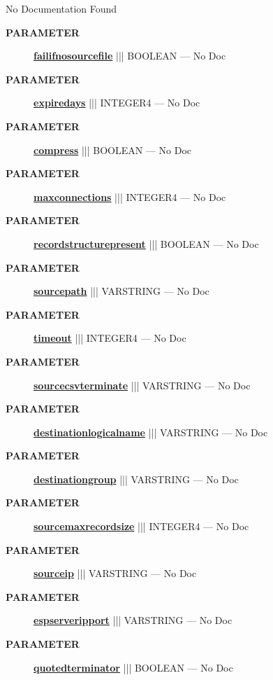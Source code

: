 No Documentation Found






\par
\begin{description}
\item [\colorbox{tagtype}{\color{white} \textbf{\textsf{PARAMETER}}}] \textbf{\underline{failifnosourcefile}} ||| BOOLEAN --- No Doc
\item [\colorbox{tagtype}{\color{white} \textbf{\textsf{PARAMETER}}}] \textbf{\underline{expiredays}} ||| INTEGER4 --- No Doc
\item [\colorbox{tagtype}{\color{white} \textbf{\textsf{PARAMETER}}}] \textbf{\underline{compress}} ||| BOOLEAN --- No Doc
\item [\colorbox{tagtype}{\color{white} \textbf{\textsf{PARAMETER}}}] \textbf{\underline{maxconnections}} ||| INTEGER4 --- No Doc
\item [\colorbox{tagtype}{\color{white} \textbf{\textsf{PARAMETER}}}] \textbf{\underline{recordstructurepresent}} ||| BOOLEAN --- No Doc
\item [\colorbox{tagtype}{\color{white} \textbf{\textsf{PARAMETER}}}] \textbf{\underline{sourcepath}} ||| VARSTRING --- No Doc
\item [\colorbox{tagtype}{\color{white} \textbf{\textsf{PARAMETER}}}] \textbf{\underline{timeout}} ||| INTEGER4 --- No Doc
\item [\colorbox{tagtype}{\color{white} \textbf{\textsf{PARAMETER}}}] \textbf{\underline{sourcecsvterminate}} ||| VARSTRING --- No Doc
\item [\colorbox{tagtype}{\color{white} \textbf{\textsf{PARAMETER}}}] \textbf{\underline{destinationlogicalname}} ||| VARSTRING --- No Doc
\item [\colorbox{tagtype}{\color{white} \textbf{\textsf{PARAMETER}}}] \textbf{\underline{destinationgroup}} ||| VARSTRING --- No Doc
\item [\colorbox{tagtype}{\color{white} \textbf{\textsf{PARAMETER}}}] \textbf{\underline{sourcemaxrecordsize}} ||| INTEGER4 --- No Doc
\item [\colorbox{tagtype}{\color{white} \textbf{\textsf{PARAMETER}}}] \textbf{\underline{sourceip}} ||| VARSTRING --- No Doc
\item [\colorbox{tagtype}{\color{white} \textbf{\textsf{PARAMETER}}}] \textbf{\underline{espserveripport}} ||| VARSTRING --- No Doc
\item [\colorbox{tagtype}{\color{white} \textbf{\textsf{PARAMETER}}}] \textbf{\underline{quotedterminator}} ||| BOOLEAN --- No Doc

\end{description}
